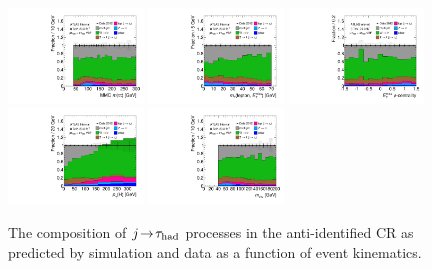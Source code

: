 \begin{figure}[tp]
  \includegraphics[width=0.32\textwidth]{figures/rx/vbf-mvaSR/mMMC}
  \includegraphics[width=0.32\textwidth]{figures/rx/vbf-mvaSR/mT}
  \includegraphics[width=0.32\textwidth]{figures/rx/vbf-mvaSR/met-phi-centrality}
  \includegraphics[width=0.32\textwidth]{figures/rx/vbf-mvaSR/H-pt-hi}
  \includegraphics[width=0.32\textwidth]{figures/rx/vbf-mvaSR/mvis}
  \caption{The composition of $j\!\rightarrow\!\tau_\text{had}$ processes in the anti-identified CR as predicted by simulation and data as a function of event kinematics.}
  \label{fig:backgrounds-rx-vbf-taus}
\end{figure}

\clearpage

